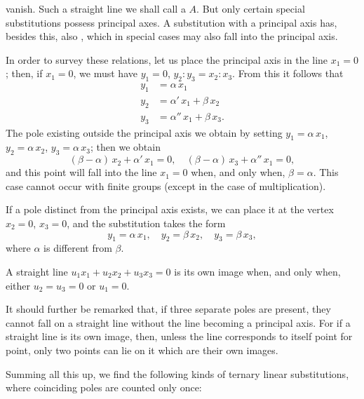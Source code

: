 vanish. Such a straight line we shall call a  $A$. But only certain special substitutions possess principal axes. A substitution with a principal axis has, besides this, also , which in special cases may also fall into the principal axis.

In order to survey these relations, let us place the principal axis in the line $x_1=0$; then, if $x_1=0$, we must have $y_1=0$, $y_2:y_3=x_2:x_3$. From this it follows that
\[
\begin{aligned}
y_1 &= \alpha\, x_1\\
y_2 &= \alpha'\, x_1 + \beta\, x_2\\
y_3 &= \alpha''\, x_1 + \beta\, x_3.
\end{aligned}
\]
The pole existing outside the principal axis we obtain by setting $y_1=\alpha\,x_1$, $y_2=\alpha\,x_2$, $y_3=\alpha\,x_3$; then we obtain
\[
(\beta-\alpha)\,x_2+\alpha'\,x_1=0,\quad (\beta-\alpha)\,x_3+\alpha''\,x_1=0,
\]
and this point will fall into the line $x_1=0$ when, and only when, $\beta=\alpha$. This case cannot occur with finite groups (except in the case of multiplication).

If a pole distinct from the principal axis exists, we can place it at the vertex $x_2=0$, $x_3=0$, and the substitution takes the form
\[
y_1=\alpha\,x_1,\quad y_2=\beta\,x_2,\quad y_3=\beta\,x_3,
\]
where $\alpha$ is different from $\beta$.

A straight line $u_1x_1+u_2x_2+u_3x_3=0$ is its own image when, and only when, either $u_2=u_3=0$ or $u_1=0$.


It should further be remarked that, if three separate poles are present, they cannot fall on a straight line without the line becoming a principal axis. For if a straight line is its own image, then, unless the line corresponds to itself point for point, only two points can lie on it which are their own images.

Summing all this up, we find the following kinds of ternary linear substitutions, where coinciding poles are counted only once:
